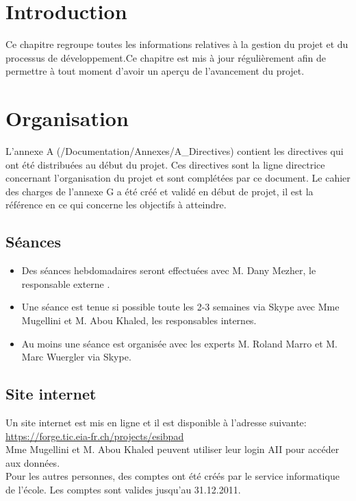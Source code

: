 	\section{Introduction}
	Ce chapitre regroupe toutes les informations relatives à la gestion du projet et du processus de développement.Ce chapitre est mis à jour régulièrement afin de permettre à tout moment d'avoir un aperçu de l'avancement du projet.

\section{Organisation}
	L'annexe A (/Documentation/Annexes/A\_Directives) contient les directives qui ont été distribuées au début du projet. Ces directives sont la ligne directrice concernant l'organisation du projet et sont complétées par ce document.
	Le cahier des charges de l'annexe G a été créé et validé en début de projet, il est la référence en ce qui concerne les objectifs à atteindre. 
	
	\subsection{Séances}
	\begin{itemize}
		\item Des séances hebdomadaires seront effectuées avec M. Dany Mezher, le responsable externe .
		\item Une séance est tenue si possible toute les 2-3 semaines via Skype avec Mme Mugellini et M. Abou Khaled, les responsables internes.
		\item Au moins une séance est organisée avec les experts M. Roland Marro et M. Marc Wuergler via Skype.
	\end{itemize}
	\subsection{Site internet}
		Un site internet est mis en ligne et il est disponible à l'adresse suivante: \url{https://forge.tic.eia-fr.ch/projects/esibpad} \\
		Mme Mugellini et M. Abou Khaled peuvent utiliser leur login AII pour accéder aux données.\\
		Pour les autres personnes, des comptes ont été créés par le service informatique de l'école. Les comptes sont valides jusqu'au 31.12.2011. \\[1cm]
		
